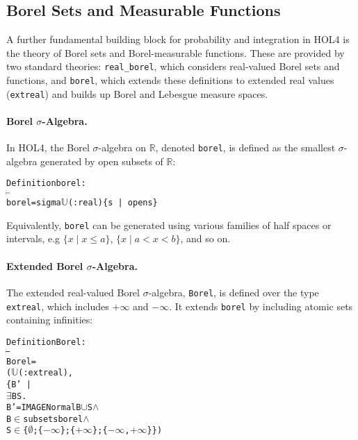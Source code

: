 \subsection{Borel Sets and Measurable Functions}

A further fundamental building block for probability and integration in HOL4 is the theory of Borel sets and Borel-measurable functions. These are provided by two standard theories: \texttt{real\_borel}, which considers real-valued Borel sets and functions, and \texttt{borel}, which extends these definitions to extended real values (\texttt{extreal}) and builds up Borel and Lebesgue measure spaces.

\paragraph{Borel $\sigma$-Algebra.}
In HOL4, the Borel $\sigma$-algebra on $ \mathbb{R} $, denoted \texttt{borel}, is defined as the smallest $\sigma$-algebra generated by open subsets of $ \mathbb{R} $:
\begin{hol}
  \begin{alltt}
    Definition borel :
    \(\!\!\!{\turn}\!\!\!\!\)
    borel = sigma \(\mathbb{U}\)(:real) \{s \,|\, open s\}
  \end{alltt}
\end{hol}

Equivalently, \texttt{borel} can be generated using various families of half spaces or intervals, e.g $ \{ x \mid x \leq a \} $, $ \{ x \mid a < x < b \} $, and so on.

\paragraph{Extended Borel $\sigma$-Algebra.}
The extended real-valued Borel $\sigma$-algebra, \texttt{Borel}, is defined over the type \texttt{extreal}, which includes $ +\infty $ and $ -\infty $. It extends \texttt{borel} by including atomic sets containing infinities:

\begin{hol}
  \begin{alltt}
    Definition Borel :
    \(\!\!\!{\turn}\!\!\!\!\)
    Borel =
    (\(\mathbb{U}\)(:extreal),
    \{B' \,|\,
    \(\exists\)B S.
    B' = IMAGE Normal B \(\cup\) S \(\land\)
    B \(\in\) subsets borel \(\land\)
    S \(\in\) \{\(\emptyset\); \{\(-\infty\)\}; \{\(+\infty\)\}; \{\(-\infty\), \(+\infty\)\}\})
  \end{alltt}
\end{hol}

